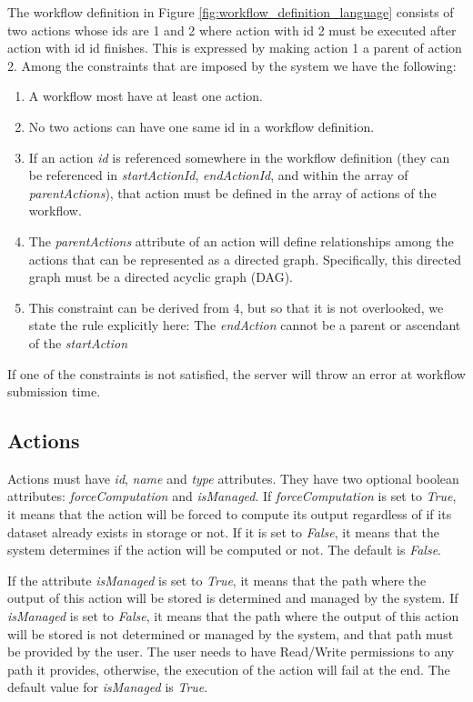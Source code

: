 The workflow definition in Figure \ref{fig:workflow_definition_language} consists of two actions whose ids are 1 and 2 where action with id 2 must be executed after action with id id finishes. This is expressed by making action 1 a parent of action 2. Among the constraints that are imposed by the system we have the following:

\begin{enumerate}
\item A workflow most have at least one action.
\item No two actions can have one same id in a workflow definition.
\item If an action \textit{id} is referenced somewhere in the workflow definition (they can be referenced in \textit{startActionId}, \textit{endActionId}, and within the array of \textit{parentActions}), that action must be defined in the array of actions of the workflow.
\item The \textit{parentActions} attribute of an action will define relationships among the actions that can be represented as a directed graph. Specifically, this directed graph must be a directed acyclic graph (DAG).
\item This constraint can be derived from 4, but so that it is not overlooked, we state the rule explicitly here: The \textit{endAction} cannot be a parent or ascendant of the \textit{startAction}
\end{enumerate}

If one of the constraints is not satisfied, the server will throw an error at workflow submission time.

\subsection{Actions}
Actions must have \textit{id}, \textit{name} and \textit{type} attributes. They have two optional boolean attributes: \textit{forceComputation} and \textit{isManaged}. If \textit{forceComputation} is set to \textit{True}, it means that the action will be forced to compute its output regardless of if its dataset  already exists in storage or not. If it is set to \textit{False}, it means that the system determines if the action will be computed or not. The default is \textit{False}.

If the attribute \textit{isManaged} is set to \textit{True}, it means that the path where the output of this action will be stored is determined and managed by the system. If \textit{isManaged} is set to \textit{False}, it means that the path where the output of this action will be stored is not determined or managed by the system, and that path must be provided by the user. The user needs to have Read/Write permissions to any path it provides, otherwise, the execution of the action will fail at the end. The default value for \textit{isManaged} is \textit{True}.

